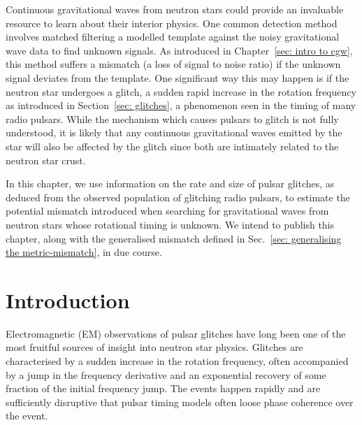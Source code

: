 \documentclass[../full_thesis/full_thesis.tex]{subfiles}
\begin{document}
Continuous gravitational waves from neutron stars could provide an invaluable
resource to learn about their interior physics. One common detection method involves
matched filtering a modelled template against the noisy gravitational wave data
to find unknown signals. As introduced in Chapter~\ref{sec: intro to cgw}, this
method suffers a mismatch (a loss of signal to noise ratio) if the unknown
signal deviates from the template. One significant way this may happen is if
the neutron star undergoes a glitch, a sudden rapid increase in the rotation
frequency as introduced in Section~\ref{sec: glitches}, a phenomenon seen in the
timing of many radio pulsars.  While the mechanism which causes pulsars to
glitch is not fully understood, it is likely that any continuous
gravitational waves emitted by the star will also be affected by the glitch since
both are intimately related to the neutron star crust.

In this chapter, we use information on the rate and size of pulsar glitches, as
deduced from the observed population of glitching radio pulsars, to estimate
the potential mismatch introduced when searching for gravitational waves from
neutron stars whose rotational timing is unknown. We intend to publish this
chapter, along with the generalised mismatch defined in Sec.~\ref{sec:
generalising the metric-mismatch}, in due course.



\section{Introduction}
\label{sec: glitches introduction}

Electromagnetic (EM) observations of pulsar glitches have long been one of the most
fruitful sources of insight into neutron star physics. Glitches are characterised
by a sudden increase in the rotation frequency, often accompanied by a jump in
the frequency derivative and an exponential recovery of some fraction of the
initial frequency jump. The events happen
rapidly and are sufficiently disruptive that pulsar timing models often loose phase
coherence over the event.
\end{document}
